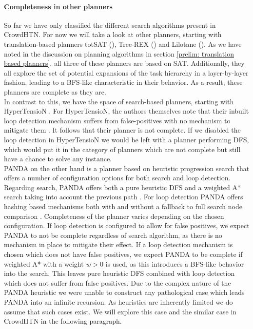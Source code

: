 \paragraph{Completeness in other planners}
So far we have only classified the different search algorithms present in CrowdHTN. For now we will take a look at other planners, starting with translation-based planners totSAT (\cite{behnke2018totsat}), Tree-REX (\cite{schreiber2019tree}) and Lilotane (\cite{schreiber2021lilotane}). As we have noted in the discussion on planning algorithms in section \ref{prelim: translation based planners}, all three of these planners are based on SAT. Additionally, they all explore the set of potential expansions of the task hierarchy in a layer-by-layer fashion, leading to a BFS-like characteristic in their behavior. As a result, these planners are complete as they are. \\
In contrast to this, we have the space of search-based planners, starting with HyperTensioN \cite{magnaguagno2020hypertension}. For HyperTensioN, the authors themselves note that their inbuilt loop detection mechanism suffers from false-positives with no mechanism to mitigate them \cite{magnaguagno2020hypertension}. It follows that their planner is not complete. If we disabled the loop detection in HyperTensioN we would be left with a planner performing DFS, which would put it in the category of planners which are not complete but still have a chance to solve any instance. \\
PANDA on the other hand is a planner based on heuristic progression search that offers a number of configuration options for both search and loop detection. Regarding search, PANDA offers both a pure heuristic DFS and a weighted A* search taking into account the previous path \cite{holler2020htn}. For loop detection PANDA offers hashing based mechanisms both with and without a fallback to full search node comparison \cite{holler2021loop}. Completeness of the planner varies depending on the chosen configuration. If loop detection is configured to allow for false positives, we expect PANDA to not be complete regardless of search algorithm, as there is no mechanism in place to mitigate their effect. If a loop detection mechanism is chosen which does not have false positives, we expect PANDA to be complete if weighted A* with a weight $w > 0$ is used, as this introduces a BFS-like behavior into the search. This leaves pure heuristic DFS combined with loop detection which does not suffer from false positives. Due to the complex nature of the PANDA heuristic we were unable to construct any pathological case which leads PANDA into an infinite recursion. As heuristics are inherently limited we do assume that such cases exist. We will explore this case and the similar case in CrowdHTN in the following paragraph.

